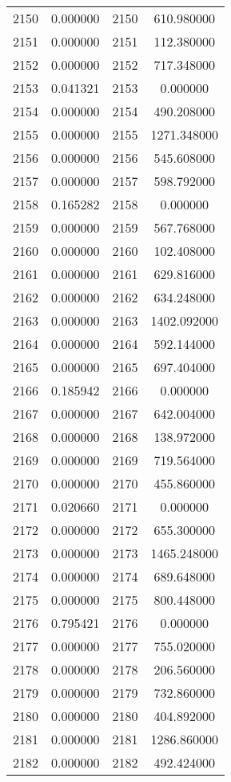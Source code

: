 \documentclass[12pt]{article}
\begin{document}
\begin{longtable}{@{}cccc@{}}
2150 & 0.000000 & 2150 & 610.980000 \\
2151 & 0.000000 & 2151 & 112.380000 \\
2152 & 0.000000 & 2152 & 717.348000 \\
2153 & 0.041321 & 2153 & 0.000000 \\
2154 & 0.000000 & 2154 & 490.208000 \\
2155 & 0.000000 & 2155 & 1271.348000 \\
2156 & 0.000000 & 2156 & 545.608000 \\
2157 & 0.000000 & 2157 & 598.792000 \\
2158 & 0.165282 & 2158 & 0.000000 \\
2159 & 0.000000 & 2159 & 567.768000 \\
2160 & 0.000000 & 2160 & 102.408000 \\
2161 & 0.000000 & 2161 & 629.816000 \\
2162 & 0.000000 & 2162 & 634.248000 \\
2163 & 0.000000 & 2163 & 1402.092000 \\
2164 & 0.000000 & 2164 & 592.144000 \\
2165 & 0.000000 & 2165 & 697.404000 \\
2166 & 0.185942 & 2166 & 0.000000 \\
2167 & 0.000000 & 2167 & 642.004000 \\
2168 & 0.000000 & 2168 & 138.972000 \\
2169 & 0.000000 & 2169 & 719.564000 \\
2170 & 0.000000 & 2170 & 455.860000 \\
2171 & 0.020660 & 2171 & 0.000000 \\
2172 & 0.000000 & 2172 & 655.300000 \\
2173 & 0.000000 & 2173 & 1465.248000 \\
2174 & 0.000000 & 2174 & 689.648000 \\
2175 & 0.000000 & 2175 & 800.448000 \\
2176 & 0.795421 & 2176 & 0.000000 \\
2177 & 0.000000 & 2177 & 755.020000 \\
2178 & 0.000000 & 2178 & 206.560000 \\
2179 & 0.000000 & 2179 & 732.860000 \\
2180 & 0.000000 & 2180 & 404.892000 \\
2181 & 0.000000 & 2181 & 1286.860000 \\
2182 & 0.000000 & 2182 & 492.424000 \\

\end{longtable}
\end{document}
